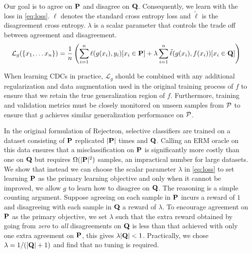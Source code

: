 Our goal is to agree on $\mathbf{P}$ and disagree on $\mathbf{Q}$.
Consequently, we learn with the loss in \autoref{eq:loss}. $\ell$ denotes the standard cross entropy loss and $\tilde{\ell}$ is the disagreement cross entropy. $\lambda$ is a scalar parameter that controls the trade off between agreement and disagreement.
\begin{equation}
    \mathcal{L}_g(\{x_1, \ldots x_n\}) = \frac{1}{n}\left(\sum_{i=1}^n \ell(g(x_i), y_i)[x_i\in \mathbf{P}] + \lambda\sum_{i=1}^n \tilde{\ell}(g(x_i), f(x_i))[x_i\in \mathbf{Q}] \right)
    \label{eq:loss}
\end{equation}

When learning CDCs in practice, $\mathcal{L}_g$ should be combined with any additional regularization and data augmentation used in the original training process of $f$ to ensure that we retain the true generalization region of $f$.
Furthermore, training and validation metrics must be closely monitored on unseen samples from $\mathcal{P}$ to ensure that $g$ achieves similar generalization performance on $\mathcal{P}$.


 In the original formulation of Rejectron, selective classifiers are trained on a dataset consisting of $\mathbf{P}$ replicated $|\mathbf{P}|$ times and $\mathbf{Q}$.
Calling an ERM oracle on this data ensures that a misclassification on $\mathbf{P}$ is significantly more costly than one on $\mathbf{Q}$ but requires $\Omega(|\mathbf{P}|^2 )$ samples, an impractical number for large datasets.
We show that instead we can choose the scalar parameter $\lambda$ in \autoref{eq:loss} to set learning $\mathbf{P}$ as the primary learning objective and only when it cannot be improved, we allow $g$ to learn how to disagree on $\mathbf{Q}$.
The reasoning is a simple counting argument.
Suppose agreeing on each sample in $\mathbf{P}$ incurs a reward of $1$ and disagreeing with each sample in $\mathbf{Q}$ a reward of $\lambda$.
To encourage agreement on $\mathbf{P}$ as the primary objective, we set $\lambda$ such that the extra reward obtained by going from \textit{zero} to \textit{all} disagreements on $\mathbf{Q}$ is less than that achieved with only one extra agreement on $\mathbf{P}$, this gives $\lambda|\mathbf{Q}| < 1$.
Practically, we chose $\lambda=1/(|\mathbf{Q}| + 1)$ and find that no tuning is required.

